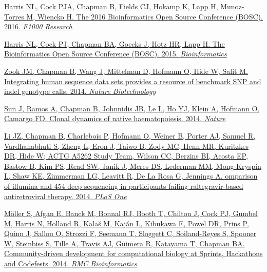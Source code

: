 \documentclass[10pt]{article}
\makeatletter
\newlength{\bibhang}
\newlength{\bibsep}
 {\@listi \global\bibsep\itemsep \global\advance\bibsep by\parsep}
\newenvironment{bibsection}%
        {\vspace{-\baselineskip}\begin{list}{}{%
       \setlength{\leftmargin}{\bibhang}%
       \setlength{\itemindent}{-\leftmargin}%
       \setlength{\itemsep}{\bibsep}%
       \setlength{\parsep}{\z@}%
        \setlength{\partopsep}{0pt}%
        \setlength{\topsep}{0pt}}}
        {\end{list}\vspace{-.6\baselineskip}}
\makeatother
\begin{document}
\begin{bibsection}
  \item \href{https://dx.doi.org/10.12688%2Ff1000research.9663.1}
    {Harris NL, Cock PJA, Chapman B, Fields CJ, Hokamp K, Lapp H, Munoz-Torres
      M, Wiencko H. The 2016 Bioinformatics Open Source Conference (BOSC). 2016.
      \textit{F1000 Research}}

 \item \href{http://bioinformatics.oxfordjournals.org/content/31/2/299.long}
    {Harris NL, Cock PJ, Chapman BA, Goecks J, Hotz HR, Lapp H.
     The Bioinformatics Open Source Conference (BOSC). 2015.
     \textit{Bioinformatics}}

 \item \href{http://www.nature.com/nbt/journal/v32/n3/full/nbt.2835.html}
   {Zook JM, Chapman B, Wang J, Mittelman D, Hofmann O, Hide W, Salit M.
    Integrating human sequence data sets provides a resource of benchmark SNP
    and indel genotype calls. 2014. \textit{Nature Biotechnology}}

  \item \href{http://www.nature.com/nature/journal/v514/n7522/full/nature13824.html}
    {Sun J, Ramos A, Chapman B, Johnnidis JB, Le L, Ho YJ, Klein A, Hofmann O,
     Camargo FD.
     Clonal dynamics of native haematopoiesis. 2014.
     \textit{Nature}}

  \item \href{http://journals.plos.org/plosone/article?id=10.1371/journal.pone.0090485}
    {Li JZ, Chapman B, Charlebois P, Hofmann O, Weiner B, Porter AJ, Samuel R,
     Vardhanabhuti S, Zheng L, Eron J, Taiwo B, Zody MC, Henn MR, Kuritzkes DR,
     Hide W; ACTG A5262 Study Team, Wilson CC, Berzins BI, Acosta EP, Bastow B,
     Kim PS, Read SW, Janik J, Meres DS, Lederman MM, Mong-Kryspin L, Shaw KE,
     Zimmerman LG, Leavitt R, De La Rosa G, Jennings A.
     omparison of illumina and 454 deep sequencing in participants failing
     raltegravir-based antiretroviral therapy. 2014.
     \textit{PLoS One}}

  \item \href{http://www.biomedcentral.com/1471-2105/15/S14/S7}
    {Möller S, Afgan E, Banck M, Bonnal RJ, Booth T, Chilton J, Cock PJ, Gumbel
     M, Harris N, Holland R, Kalaš M, Kaján L, Kibukawa E, Powel DR, Prins P,
     Quinn J, Sallou O, Strozzi F, Seemann T, Sloggett C, Soiland-Reyes S,
     Spooner W, Steinbiss S, Tille A, Travis AJ, Guimera R, Katayama T, Chapman
     BA.
     Community-driven development for computational biology at Sprints,
     Hackathons and Codefests. 2014.
     \textit{BMC Bioinformatics}}


\end{bibsection}
\end{document}
